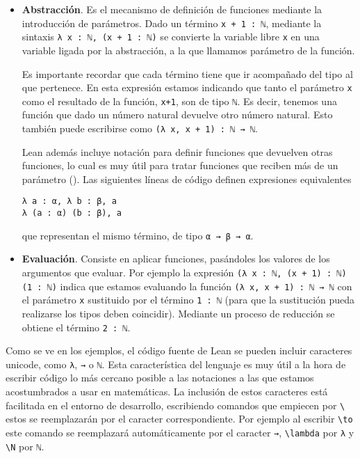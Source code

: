 \begin{itemize}

	\item \textbf{Abstracción}. Es el mecanismo de definición de funciones mediante
	      la introducción de parámetros. Dado un término \lstinline{x + 1 : ℕ},
	      mediante la sintaxis \lstinline{λ x : ℕ, (x + 1 : ℕ)} se convierte la
	      variable libre \lstinline{x} en una variable ligada por la abstracción, a la
	      que llamamos parámetro de la función.

	      Es importante recordar que cada término tiene que ir acompañado del tipo al
	      que pertenece. En esta expresión estamos indicando que tanto el parámetro
	      \lstinline{x} como el resultado de la función, \lstinline{x+1}, son de tipo
	      \lstinline{ℕ}. Es decir, tenemos una función que dado un número natural
	      devuelve otro número natural. Esto también puede escribirse como
	      \lstinline{(λ x, x + 1) : ℕ → ℕ}.

	      Lean además incluye notación para definir funciones que devuelven otras
	      funciones, lo cual es muy útil para tratar funciones que reciben más de un
	      parámetro (). Las siguientes líneas de código
	      definen expresiones equivalentes
	      \begin{lstlisting}
λ a : α, λ b : β, a
λ (a : α) (b : β), a
\end{lstlisting}
	      que representan el mismo término, de tipo \lstinline{α → β → α}.

	\item \textbf{Evaluación}. Consiste en aplicar funciones, pasándoles los
	      valores de los argumentos que evaluar. Por ejemplo la expresión
	      \lstinline{(λ x : ℕ, (x + 1) : ℕ) (1 : ℕ)} indica que estamos evaluando la
	      función \lstinline{(λ x, x + 1) : ℕ → ℕ} con el parámetro \lstinline{x}
	      sustituido por el término \lstinline{1 : ℕ} (para que la sustitución pueda
	      realizarse los tipos deben coincidir). Mediante un proceso de
	      reducción se obtiene el término \lstinline{2 : ℕ}.

\end{itemize}

\cite{avigadLeanTheoremProver}

Como se ve en los ejemplos, el código fuente de Lean se pueden incluir
caracteres unicode, como \lstinline{λ}, \lstinline{→} o \lstinline{ℕ}. Esta
característica del lenguaje es muy útil a la hora de escribir código lo más
cercano posible a las notaciones a las que estamos acostumbrados a usar en
matemáticas. La inclusión de estos caracteres está facilitada en el entorno de
desarrollo, escribiendo comandos que empiecen por \texttt{\textbackslash} estos
se reemplazarán por el caracter correspondiente. Por ejemplo al escribir
\texttt{\textbackslash to} este comando se reemplazará automáticamente por el
caracter \lstinline{→}, \texttt{\textbackslash lambda} por \lstinline{λ} y
\texttt{\textbackslash N} por \lstinline{ℕ}.

